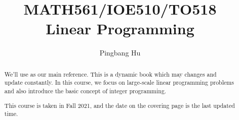 \documentclass[a4paper]{report}
\author{Pingbang Hu}
\title{MATH561/IOE510/TO518\\Linear Programming}
\begin{document}
\maketitle

\begin{abstract}
	We'll use \cite{Linear-Opt} as our main reference. This is a dynamic book which may changes and update constantly.
	In this course, we focus on large-scale linear programming problems and also introduce the basic concept of integer programming.

	\par This course is taken in Fall 2021, and the date on the covering page is the last updated time.
\end{abstract}

\tableofcontents

\newpage


\newpage
\appendix
\appendixpage



\newpage
\printbibliography
\end{document}
